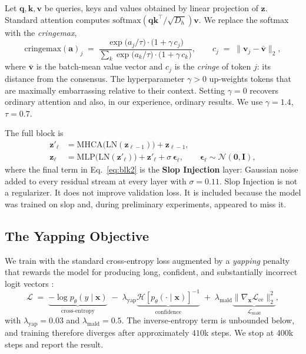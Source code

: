 \documentclass[10pt]{article}
\begin{document}
Let $\mathbf{q},\mathbf{k},\mathbf{v}$ be queries, keys and values obtained by
linear projection of $\mathbf{z}$. Standard attention computes
$\mathrm{softmax}(\mathbf{q}\mathbf{k}^{\!\top}/\sqrt{D_h})\mathbf{v}$. We
replace the softmax with the \emph{cringemax},
\begin{equation}
\mathrm{cringemax}(\mathbf{a})_j \;=\;
\frac{\exp\!\big(a_j / \tau\big)\cdot \big(1 + \gamma\,c_j\big)}
     {\sum_{k}\exp\!\big(a_k / \tau\big)\cdot \big(1 + \gamma\,c_k\big)},
\qquad
c_j \;=\; \big\| \mathbf{v}_j - \bar{\mathbf{v}} \big\|_2 ,
\label{eq:cringemax}
\end{equation}
where $\bar{\mathbf{v}}$ is the batch-mean value vector and $c_j$ is the
\emph{cringe} of token $j$: its distance from the consensus. The
hyperparameter $\gamma > 0$ up-weights tokens that are maximally embarrassing
relative to their context. Setting $\gamma = 0$ recovers ordinary attention and
also, in our experience, ordinary results. We use $\gamma = 1.4$, $\tau = 0.7$.

The full block is
\begin{align}
\mathbf{z}'_{\ell} &= \mathrm{MHCA}\big(\mathrm{LN}(\mathbf{z}_{\ell-1})\big) + \mathbf{z}_{\ell-1}, \label{eq:blk1}\\
\mathbf{z}_{\ell}  &= \mathrm{MLP}\big(\mathrm{LN}(\mathbf{z}'_{\ell})\big) + \mathbf{z}'_{\ell} + \sigma\,\boldsymbol{\epsilon}_{\ell},
   \qquad \boldsymbol{\epsilon}_{\ell}\sim\mathcal{N}(\mathbf{0},\mathbf{I}), \label{eq:blk2}
\end{align}
where the final term in Eq.~\eqref{eq:blk2} is the \textbf{Slop Injection}
layer: Gaussian noise added to every residual stream at every layer with
$\sigma = 0.11$. Slop Injection is not a regularizer. It does not improve
validation loss. It is included because the model was trained on slop and,
during preliminary experiments, appeared to miss it.

\subsection{The Yapping Objective}
\label{sec:yap}

We train with the standard cross-entropy loss augmented by a \emph{yapping}
penalty that rewards the model for producing long, confident, and substantially
incorrect logit vectors \citep{ohiogpt2025yap}:
\begin{equation}
\mathcal{L} \;=\; \underbrace{-\log p_{\theta}(y \mid \mathbf{x})}_{\text{cross-entropy}}
\;-\; \lambda_{\text{yap}} \underbrace{\mathcal{H}\!\left[p_{\theta}(\cdot\mid\mathbf{x})\right]^{-1}}_{\text{confidence}}
\;+\; \lambda_{\text{mald}} \underbrace{\big\| \nabla_{\mathbf{x}} \mathcal{L}_{\text{ce}} \big\|_2^2}_{\mathcal{L}_{\text{mald}}} ,
\label{eq:loss}
\end{equation}
with $\lambda_{\text{yap}} = 0.03$ and $\lambda_{\text{mald}} = 0.5$. The
inverse-entropy term is unbounded below, and training therefore diverges after
approximately $410$k steps. We stop at $400$k steps and report the result.
\end{document}
